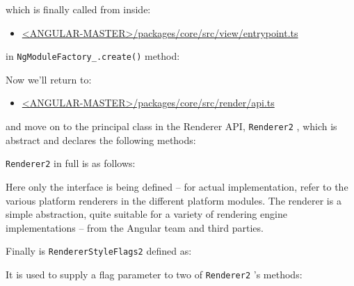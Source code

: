 

which is finally called from inside:

\begin{itemize}
  \item \href{https://github.com/angular/angular/blob/master/packages/core/src/view/entrypoint.ts}
        {<ANGULAR-MASTER>/packages/core/src/view/entrypoint.ts}
\end{itemize}

in
\texttt{NgModuleFactory\_.create()}
method:



Now we’ll return to:

\begin{itemize}
  \item \href{https://github.com/angular/angular/blob/master/packages/core/src/render/api.ts}
        {<ANGULAR-MASTER>/packages/core/src/render/api.ts}
\end{itemize}

and move on to the principal class in the Renderer API,
\texttt{Renderer2}
, which is abstract
and declares the following methods:

\texttt{Renderer2}
in full is as follows:



Here only the interface is being defined – for actual implementation, refer to the
various platform renderers in the different platform modules. The renderer is a simple
abstraction, quite suitable for a variety of rendering engine implementations – from
the Angular team and third parties.

Finally is
\texttt{RendererStyleFlags2}
defined as:



It is used to supply a flag parameter to two of
\texttt{Renderer2}
’s methods:






